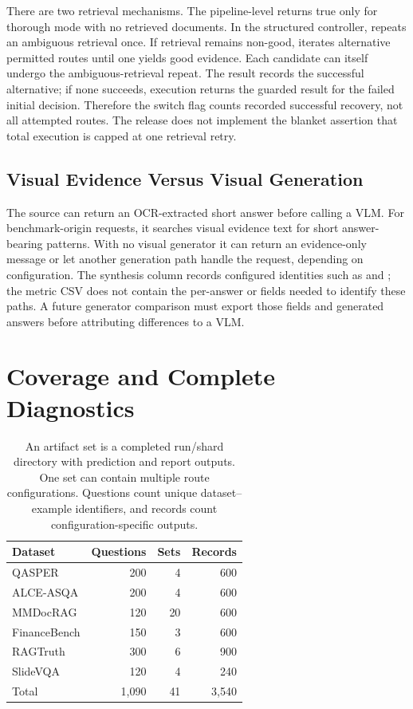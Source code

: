 There are two retrieval mechanisms. The pipeline-level  returns true only for thorough mode with no retrieved documents. In the structured controller,  repeats an ambiguous retrieval once. If retrieval remains non-good,  iterates alternative permitted routes until one yields good evidence. Each candidate can itself undergo the ambiguous-retrieval repeat. The result records the successful alternative; if none succeeds, execution returns the guarded result for the failed initial decision. Therefore the switch flag counts recorded successful recovery, not all attempted routes. The release does not implement the blanket assertion that total execution is capped at one retrieval retry.

\subsection{Visual Evidence Versus Visual Generation}
The source  can return an OCR-extracted short answer before calling a VLM. For benchmark-origin requests, it searches visual evidence text for short answer-bearing patterns. With no visual generator it can return an evidence-only message or let another generation path handle the request, depending on configuration. The synthesis column  records configured identities such as  and ; the metric CSV does not contain the per-answer  or  fields needed to identify these paths. A future generator comparison must export those fields and generated answers before attributing differences to a VLM.

\section{Coverage and Complete Diagnostics}
\label{app:results}
\begin{table}[t]
\centering
\small
\begin{tabular}{@{}lrrr@{}}
\toprule
Dataset & Questions & Sets & Records \\
\midrule
QASPER & 200 & 4 & 600 \\
ALCE-ASQA & 200 & 4 & 600 \\
MMDocRAG & 120 & 20 & 600 \\
FinanceBench & 150 & 3 & 600 \\
RAGTruth & 300 & 6 & 900 \\
SlideVQA & 120 & 4 & 240 \\
\midrule
Total & 1,090 & 41 & 3,540 \\
\bottomrule
\end{tabular}
\caption{An artifact set is a completed run/shard directory with prediction and report outputs. One set can contain multiple route configurations. Questions count unique dataset--example identifiers, and records count configuration-specific outputs.}
\label{tab:coverage}
\end{table}

